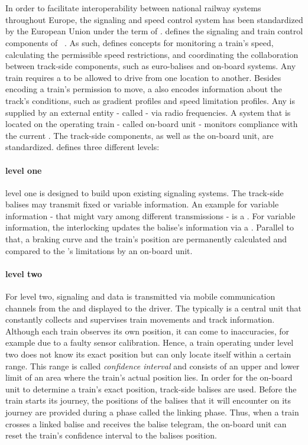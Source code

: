 \section{}
In order to facilitate interoperability between national railway systems throughout Europe, the signaling and speed control system has been standardized by the European Union under the term of .
 defines the signaling and train control components of ~\cite{ETCS26}.
As such,  defines concepts for monitoring a train's speed, calculating the permissible speed restrictions, and coordinating the collaboration between track-side components, such as  euro-balises and on-board systems.
Any train requires a  to be allowed to drive from one location to another.
Besides encoding a train's permission to move, a  also encodes information about the track's conditions, such as gradient profiles and speed limitation profiles.
Any  is supplied by an external entity - called  - via radio frequencies.
A system that is located on the operating train - called on-board unit - monitors compliance with the current .
The track-side components, as well as the on-board unit, are standardized.
 defines three different levels:

\paragraph{ level one}
 level one is designed to build upon existing signaling systems.
The track-side balises may transmit fixed or variable information.
An example for variable information - that might vary among different transmissions - is a .
For variable information, the interlocking updates the balise's information via a .
Parallel to that, a braking curve and the train's position are permanently calculated and compared to the 's limitations by an on-board unit.

\paragraph{ level two}
For  level two, signaling and  data is transmitted via mobile communication channels from the  and displayed to the driver.
The  typically is a central unit that constantly collects and supervises train movements and track information.
Although each train observes its own position, it can come to inaccuracies, for example due to a faulty sensor calibration.
Hence, a train operating under  level two does not know its exact position but can only locate itself within a certain range.
This range is called \textit{confidence interval} and consists of an upper and lower limit of an area where the train's actual position lies.
In order for the on-board unit to determine a train's exact position, track-side balises are used.
Before the train starts its journey, the positions of the balises that it will encounter on its journey are provided during a phase called the linking phase.
Thus, when a train crosses a linked balise and receives the balise telegram, the on-board unit can reset the train's confidence interval to the balises position.

